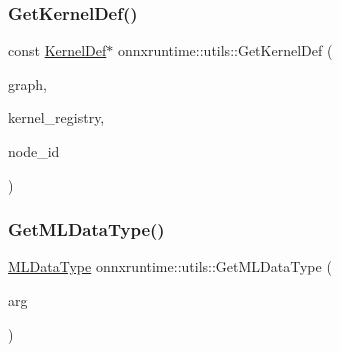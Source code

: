\subsubsection{\texorpdfstring{Get\+Kernel\+Def()}{GetKernelDef()}\hspace{0.1cm}{\footnotesize\ttfamily [2/2]}}
{\footnotesize\ttfamily const \mbox{\hyperlink{classonnxruntime_1_1KernelDef}{Kernel\+Def}}$\ast$ onnxruntime\+::utils\+::\+Get\+Kernel\+Def (\begin{DoxyParamCaption}\item[{const \mbox{\hyperlink{classonnxruntime_1_1Graph}{onnxruntime\+::\+Graph}} \&}]{graph,  }\item[{const \mbox{\hyperlink{classonnxruntime_1_1KernelRegistryManager}{Kernel\+Registry\+Manager}} \&}]{kernel\+\_\+registry,  }\item[{const \mbox{\hyperlink{namespaceonnxruntime_af8773b5c12b5d8fd9292eb2e268df760}{onnxruntime\+::\+Node\+Index}}}]{node\+\_\+id }\end{DoxyParamCaption})}

\mbox{\label{namespaceonnxruntime_1_1utils_ab22ac0ad2ec6d6529d6bacc19f7d7093}} 
\subsubsection{\texorpdfstring{Get\+M\+L\+Data\+Type()}{GetMLDataType()}}
{\footnotesize\ttfamily \mbox{\hyperlink{namespaceonnxruntime_ad77d0a6e838ec7da5dc35fed5ee66b49}{M\+L\+Data\+Type}} onnxruntime\+::utils\+::\+Get\+M\+L\+Data\+Type (\begin{DoxyParamCaption}\item[{const \mbox{\hyperlink{classonnxruntime_1_1NodeArg}{onnxruntime\+::\+Node\+Arg}} \&}]{arg }\end{DoxyParamCaption})}

\mbox{\label{namespaceonnxruntime_1_1utils_a2d84b5cf8a44b5c9ac8acdc0fd605544}} 
